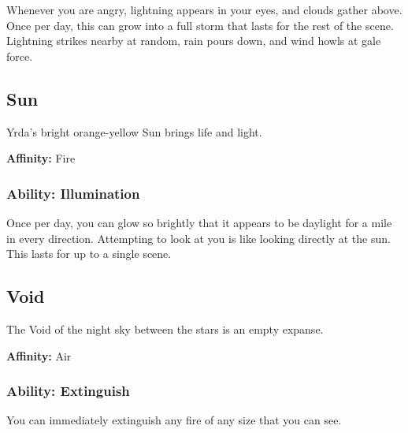 \begin{multicols}{2}
Whenever you are angry, lightning appears in your eyes, and clouds
gather above. Once per day, this can grow into a full storm that lasts
for the rest of the scene. Lightning strikes nearby at random, rain pours
down, and wind howls at gale force.

\subsection{Sun}

Yrda's bright orange-yellow Sun brings life and light.

\textbf{Affinity:} Fire

\subsubsection{Ability: Illumination}

Once per day, you can glow so brightly that it appears to be daylight
for a mile in every direction. Attempting to look at you is like looking
directly at the sun. This lasts for up to a single scene.

\subsection{Void}

The Void of the night sky between the stars is an empty expanse.

\textbf{Affinity:} Air

\subsubsection{Ability: Extinguish}

You can immediately extinguish any fire of any size that you can see.

\end{multicols}
